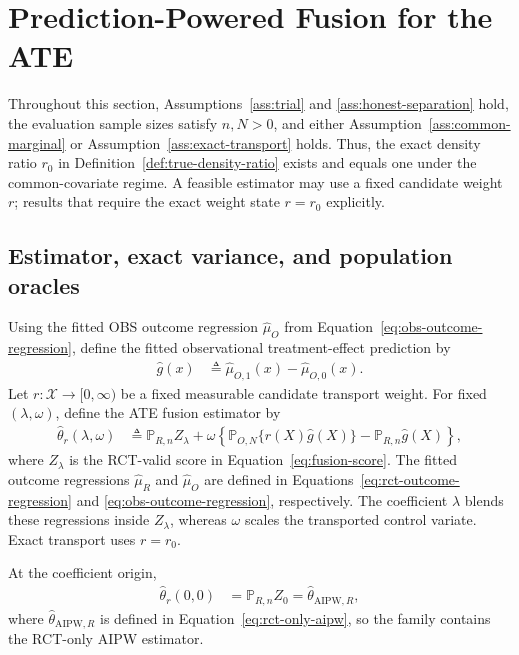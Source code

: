 \section{Prediction-Powered Fusion for the ATE}
\label{sec:ate}

Throughout this section, Assumptions~\ref{ass:trial} and
\ref{ass:honest-separation} hold, the evaluation sample sizes satisfy $n,N>0$,
and either Assumption~\ref{ass:common-marginal} or
Assumption~\ref{ass:exact-transport} holds. Thus, the exact density ratio $r_0$
in Definition~\ref{def:true-density-ratio} exists and equals one under the
common-covariate regime. A feasible estimator may use a fixed candidate weight
$r$; results that require the exact weight state $r=r_0$ explicitly.

\subsection{Estimator, exact variance, and population oracles}

\begin{definition}
	Using the fitted OBS outcome regression $\widehat\mu_O$ from
	Equation~\eqref{eq:obs-outcome-regression}, define the fitted observational
	treatment-effect prediction by
	\begin{align}
		\widehat{g}(x)
		&\triangleq \widehat\mu_{O,1}(x)-\widehat\mu_{O,0}(x).
		\label{eq:obs-effect-prediction}
	\end{align}
	Let $r:\mathcal X\to[0,\infty)$ be a fixed measurable candidate transport
	weight. For fixed $(\lambda,\omega)$, define the ATE fusion estimator by
	\begin{align}
		\widehat\theta_r(\lambda,\omega) &\triangleq
		\mathbb P_{R,n}Z_\lambda
		+
		\omega\left\{
		\mathbb P_{O,N}\{r(X)\widehat{g}(X)\}
		-
		\mathbb P_{R,n}\widehat{g}(X)
		\right\},
		\label{eq:ate-estimator}
	\end{align}
	where $Z_\lambda$ is the RCT-valid score in
	Equation~\eqref{eq:fusion-score}. The fitted outcome regressions
	$\widehat\mu_R$ and $\widehat\mu_O$ are defined in
	Equations~\eqref{eq:rct-outcome-regression} and
	\eqref{eq:obs-outcome-regression}, respectively. The coefficient $\lambda$
	blends these regressions inside $Z_\lambda$, whereas $\omega$ scales the
	transported control variate. Exact transport uses $r=r_0$.
\end{definition}
At the coefficient origin,
\begin{align*}
	\widehat\theta_r(0,0) &=\mathbb P_{R,n}Z_0 =\widehat\theta_{\mathrm{AIPW},R},
\end{align*}
where $\widehat\theta_{\mathrm{AIPW},R}$ is defined in Equation~\eqref{eq:rct-only-aipw}, so the family contains the RCT-only AIPW estimator.

